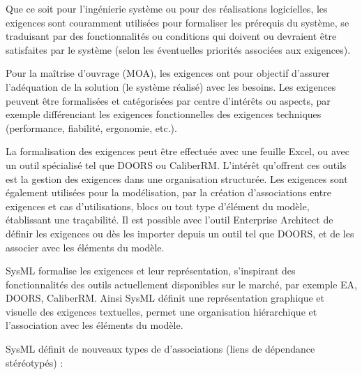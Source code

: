 \documentclass[12pt,a4paper]{report}
\begin{document}
\noindent \begin{flushleft}
	
	
	Que ce soit pour l'ing\'{e}nierie syst\`{e}me ou pour des r\'{e}alisations logicielles, les exigences sont couramment utilis\'{e}es pour formaliser les pr\'{e}requis du syst\`{e}me, se traduisant par des fonctionnalit\'{e}s ou conditions qui doivent ou devraient \^{e}tre satisfaites par le syst\`{e}me (selon les \'{e}ventuelles priorit\'{e}s associ\'{e}es aux exigences).
	
	Pour la ma\^{i}trise d'ouvrage (MOA), les exigences ont pour objectif d'assurer l'ad\'{e}quation de la solution (le syst\`{e}me r\'{e}alis\'{e}) avec les besoins. Les exigences peuvent \^{e}tre formalis\'{e}es et cat\'{e}goris\'{e}es par centre d'int\'{e}r\^{e}ts ou aspects, par exemple diff\'{e}renciant les exigences fonctionnelles des exigences techniques (performance, fiabilit\'{e}, ergonomie, etc.).
	
	\noindent La formalisation des exigences peut \^{e}tre effectu\'{e}e avec une feuille Excel, ou avec un outil sp\'{e}cialis\'{e} tel que DOORS ou CaliberRM. L'int\'{e}r\^{e}t qu'offrent ces outils est la gestion des exigences dans une organisation structur\'{e}e. Les exigences sont \'{e}galement utilis\'{e}es pour la mod\'{e}lisation, par la cr\'{e}ation d'associations entre exigences et cas d'utilisations, blocs ou tout type d'\'{e}l\'{e}ment du mod\`{e}le, \'{e}tablissant une tra\c{c}abilit\'{e}. Il est possible avec l'outil Enterprise Architect de d\'{e}finir les exigences ou d\`{e}s les importer depuis un outil tel que DOORS, et de les associer avec les \'{e}l\'{e}ments du mod\`{e}le.
	
	\noindent SysML formalise les exigences et leur repr\'{e}sentation, s'inspirant des fonctionnalit\'{e}s des outils actuellement disponibles sur le march\'{e}, par exemple EA, DOORS, CaliberRM. Ainsi SysML d\'{e}finit une repr\'{e}sentation graphique et visuelle des exigences textuelles, permet une organisation hi\'{e}rarchique et l'association avec les \'{e}l\'{e}ments du mod\`{e}le.
	
	\noindent 
	
	\noindent SysML d\'{e}finit de nouveaux types de d'associations (liens de d\'{e}pendance st\'{e}r\'{e}otyp\'{e}s) :
\end{flushleft}
\end{document}
